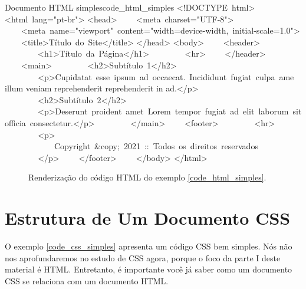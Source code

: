 \begin{htmlcode}{Documento HTML simples}{code_html_simples}
<!DOCTYPE html>
<html lang="pt-br">
<head>
    <meta charset="UTF-8">
    <meta name="viewport" content="width=device-width, initial-scale=1.0">
    <title>Título do Site</title>
</head>
<body>
    <header>
        <h1>Título da Página</h1>
        <hr>
    </header>
    <main>
        <h2>Subtítulo 1</h2>
        <p>Cupidatat esse ipsum ad occaecat. Incididunt fugiat culpa ame 
            illum veniam reprehenderit reprehenderit in ad.</p>
        <h2>Subtítulo 2</h2>
        <p>Deserunt proident amet Lorem tempor fugiat ad elit laborum sit 
            officia consectetur.</p>    
    </main>
    <footer>
        <hr>
        <p>
            Copyright &copy; 2021 :: Todos os direitos reservados
        </p>
    </footer>    
</body>
</html>
\end{htmlcode}

\begin{figure}[ht!]
    \centering
    \caption{Renderização do código HTML do exemplo \ref{code_html_simples}.}
    \label{fig:rend_html_simples}
\end{figure}

\section{Estrutura de Um Documento CSS}

O exemplo \ref{code_css_simples} apresenta um código CSS bem simples. Nós não nos aprofundaremos no estudo de CSS agora, porque o foco da parte I deste material é HTML. Entretanto, é importante você já saber como um documento CSS se relaciona com um documento HTML.

